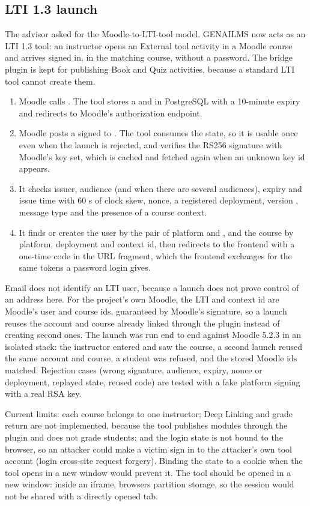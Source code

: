 \subsection{LTI 1.3 launch}\label{sec:lti}
The advisor asked for the Moodle-to-LTI-tool model. GENAILMS now acts as an LTI 1.3 tool: an instructor opens an External tool activity in a Moodle course and arrives signed in, in the matching course, without a password. The bridge plugin is kept for publishing Book and Quiz activities, because a standard LTI tool cannot create them.
\begin{enumerate}[nosep]
\item Moodle calls . The tool stores a  and  in PostgreSQL with a 10-minute expiry and redirects to Moodle's authorization endpoint.
\item Moodle posts a signed  to . The tool consumes the state, so it is usable once even when the launch is rejected, and verifies the RS256 signature with Moodle's key set, which is cached and fetched again when an unknown key id appears.
\item It checks issuer, audience (and  when there are several audiences), expiry and issue time with 60 s of clock skew, nonce, a registered deployment, version , message type  and the presence of a course context.
\item It finds or creates the user by the pair of platform and , and the course by platform, deployment and context id, then redirects to the frontend with a one-time code in the URL fragment, which the frontend exchanges for the same tokens a password login gives.
\end{enumerate}
Email does not identify an LTI user, because a launch does not prove control of an address here. For the project's own Moodle, the LTI  and context id are Moodle's user and course ids, guaranteed by Moodle's signature, so a launch reuses the account and course already linked through the plugin instead of creating second ones. The launch was run end to end against Moodle 5.2.3 in an isolated stack: the instructor entered and saw the course, a second launch reused the same account and course, a student was refused, and the stored Moodle ids matched. Rejection cases (wrong signature, audience, expiry, nonce or deployment, replayed state, reused code) are tested with a fake platform signing with a real RSA key.

Current limits: each course belongs to one instructor; Deep Linking and grade return are not implemented, because the tool publishes modules through the plugin and does not grade students; and the login state is not bound to the browser, so an attacker could make a victim sign in to the attacker's own tool account (login cross-site request forgery). Binding the state to a  cookie when the tool opens in a new window would prevent it. The tool should be opened in a new window: inside an iframe, browsers partition storage, so the session would not be shared with a directly opened tab.
